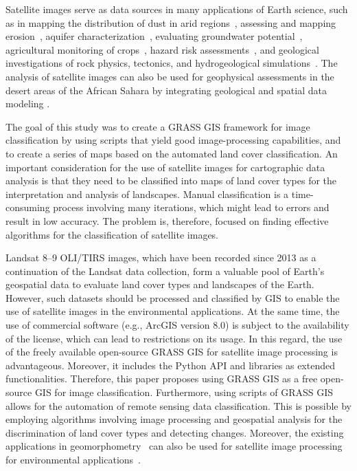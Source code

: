 \documentclass[asi,article,accept,pdftex,moreauthors]{Definitions/mdpi}
\begin{document}
Satellite images serve as data sources in many applications of Earth science, such as in mapping the distribution of dust in arid regions~\cite{Parajuli}, assessing and mapping erosion~\cite{Mihi}, aquifer characterization~\cite{AOUDIA2020103920}, evaluating groundwater potential~\cite{Derdour}, {agricultural monitoring of crops}~\cite{Benami,Butte,Daughtry,DAUGHTRY2000229}, {hazard risk assessments}~\cite{KUCHARCZYK2021112577}, and geological investigations of rock physics, tectonics, and hydrogeological simulations~\cite{NEDJRAOUI2021104348}. The analysis of satellite images can also be used for geophysical {assessments} in the desert areas {of} the African Sahara by integrating geological and spatial data modeling \cite{ZERROUK2017146}. 

{The goal of this study was to create a GRASS GIS framework for image classification by using scripts that yield good image-processing capabilities, and to create a series of maps based on the automated land cover classification. }An important consideration for the use of satellite images for cartographic data analysis is that they {need} to be classified into maps of land cover types for the interpretation and analysis of landscapes. {Manual }classification is a time-consuming process involving many iterations, which might lead to errors and result in low accuracy. The problem is, therefore, focused on finding  effective algorithms for the classification of satellite images.

Landsat 8--9 OLI/TIRS images, which have been recorded since 2013 as a continuation of the Landsat data collection, form a valuable pool of Earth's geospatial data to evaluate land cover types and landscapes of the Earth. However, such datasets should be processed and classified {by GIS }to enable the use of satellite images in the environmental applications. {At the same time, the use of commercial software (e.g., ArcGIS version 8.0)  %
 is subject to the availability of the license, which can lead to restrictions on its usage. In this regard, the use of the freely available open-source GRASS GIS for satellite image processing is advantageous. Moreover, it includes the Python API and libraries as extended functionalities. Therefore, this paper proposes}  using GRASS GIS {as a free open-source GIS for image classification. Furthermore, using} scripts {of GRASS GIS allows for the } automation of remote sensing data classification. {This is possible }by employing algorithms involving image processing and geospatial analysis for the discrimination of land cover types and detecting changes{. }Moreover, the existing applications in geomorphometry~\cite{HOFIERKA2009387} can also be used for satellite image processing for environmental applications~\cite{Lemenkova202125}.
\end{document}
